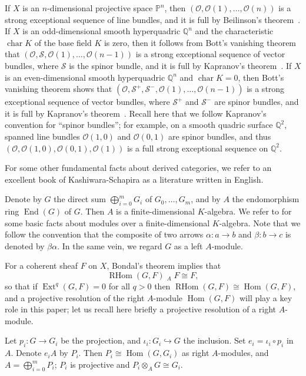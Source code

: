 \documentclass[a4paper,12pt]{amsart}
\DeclareMathOperator{\Hom}{Hom}
\DeclareMathOperator{\Ext}{Ext}
\DeclareMathOperator{\RHom}{RHom}
\DeclareMathOperator{\lotimes}{\otimes^{\mathbb{L}}}
\DeclareMathOperator{\End}{End}
\DeclareMathOperator{\ch}{char}
\begin{document}
If $X$ is an $n$-dimensional projective space $\mathbb{P}^n$, 
then $(\mathcal{O},\mathcal{O}(1),\dots,\mathcal{O}(n))$
is a strong exceptional sequence of line bundles,
and it is full by Beilinson's theorem~\cite[Theorem]{MR0509388}.
If $X$ is an odd-dimensional smooth hyperquadric $\mathbb{Q}^n$
and the characteristic $\ch K$ of the base field $K$ is zero,
then it follows from Bott's vanishing theorem 
that $(\mathcal{O},\mathcal{S},\mathcal{O}(1),\dots,\mathcal{O}(n-1))$
is a strong exceptional sequence of vector bundles,
where $\mathcal{S}$ is the spinor bundle,
and it is full by Kapranov's theorem~\cite[Theorem 4.10]{MR0939472}.
If $X$ is an even-dimensional smooth hyperquadric $\mathbb{Q}^n$
and $\ch K=0$,
then 
Bott's vanishing theorem shows
that $(\mathcal{O},\mathcal{S}^+,\mathcal{S}^-,\mathcal{O}(1),\dots,\mathcal{O}(n-1))$
is a strong exceptional sequence of vector bundles,
where $\mathcal{S}^+$ and $\mathcal{S}^-$ are spinor bundles,
and it is full by Kapranov's theorem~\cite[Theorem 4.10]{MR0939472}.
Recall here that we follow Kapranov's convention for ``spinor bundles'';
for example,
on a smooth quadric surface $\mathbb{Q}^2$, spanned line bundles $\mathcal{O}(1,0)$
and $\mathcal{O}(0,1)$ are spinor bundles,
and thus $(\mathcal{O},\mathcal{O}(1,0),\mathcal{O}(0,1),\mathcal{O}(1))$
is a full strong exceptional sequence on $\mathbb{Q}^2$.

For some other fundamental facts about derived categories,
we refer to an excellent book 
\cite{MR2182076} 
of Kashiwara-Schapira
as a literature written in English.

Denote by $G$ the direct sum $\bigoplus_{i=0}^mG_i$ of $G_0,\dots,G_m$,
and by $A$ the endomorphism ring 
$\End(G)$ of $G$.
Then $A$ is a finite-dimensional $K$-algebra.
We refer to \cite[Chap. I, II, III]{MR2197389} for some 
basic facts about modules over a finite-dimensional $K$-algebra.
Note 
that we follow the convention that 
the composite of two arrows $\alpha:a\to b$ and $\beta:b\to c$
is denoted by $\beta\alpha$.
In the same vein, we regard $G$ as a left $A$-module.

For a coherent sheaf $F$ on $X$, 
Bondal's theorem \cite[Theorem 6.2]{MR992977} implies that 
\[
\RHom(G, F)\lotimes_A F\cong F,
\]
so that if $\Ext^q(G,F)=0$ for all $q>0$
then $\RHom(G, F)\cong \Hom(G, F)$,
and a projective resolution of the right $A$-module $\Hom(G, F)$
will play a key role in this paper;
let us recall here briefly a projective resolution of a right $A$-module.

Let $p_i:G\to G_i$ be the projection,
and $\iota_i:G_i\hookrightarrow G$ the inclusion.
Set $e_i=\iota_i\circ p_i$ in $A$.
Denote $e_iA$ by $P_i$.
Then $P_i\cong \Hom(G,G_i)$ as right $A$-modules,
and $A=\bigoplus_{i=0}^m P_i$;
$P_i$ is projective and $P_i\otimes_AG\cong G_i$.
\end{document}
